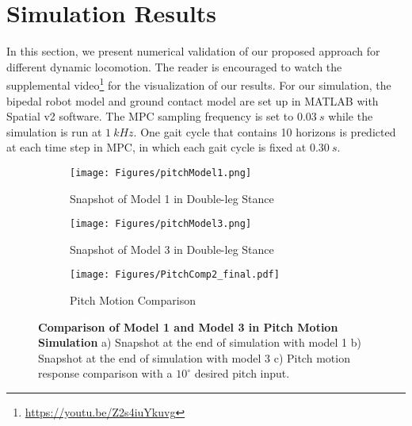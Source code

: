 \section{Simulation Results}
\label{sec:simulationResults}

In this section, we present numerical validation of our proposed approach for different dynamic locomotion. 
The reader is encouraged to watch the supplemental video\footnote{\url{https://youtu.be/Z2s4iuYkuvg}} 
for the visualization of our results.
For our simulation, the bipedal robot model and ground contact model are set up in MATLAB with Spatial v2 software. The MPC sampling frequency is set to $0.03\:\unit{s}$ while the simulation is run at $1\: \unit{kHz}$. One gait cycle that contains 10 horizons is predicted at each time step in MPC, in which each gait cycle is fixed at $0.30\:\unit{s}$. 


\begin{figure}%
\vspace{0.5cm}
     \centering
     \begin{subfigure}[b]{0.13\textwidth}
         \centering
         \texttt{[image: Figures/pitchModel1.png]}
         \caption{Snapshot of Model 1 in Double-leg Stance}
         \label{fig:pitchModel1}
     \end{subfigure}
     \quad \quad
     \begin{subfigure}[b]{0.13\textwidth}
         \centering
         \texttt{[image: Figures/pitchModel3.png]}
         \caption{Snapshot of Model 3 in Double-leg Stance}
         \label{fig:pitchModel3}
     \end{subfigure}
     \hfill
     \begin{subfigure}[b]{0.5\textwidth}
         \centering
         \texttt{[image: Figures/PitchComp2\_final.pdf]}
         \caption{Pitch Motion Comparison}
         \label{fig:pitchPlot}
     \end{subfigure}
        \caption{{\bfseries Comparison of Model 1 and Model 3 in Pitch Motion Simulation}  a) Snapshot at the end of simulation with model 1  b) Snapshot at the end of simulation with model 3   c) Pitch motion response comparison with a $10^{\circ}$ desired pitch input.}
        \label{fig:pitchComparison}
\end{figure}

